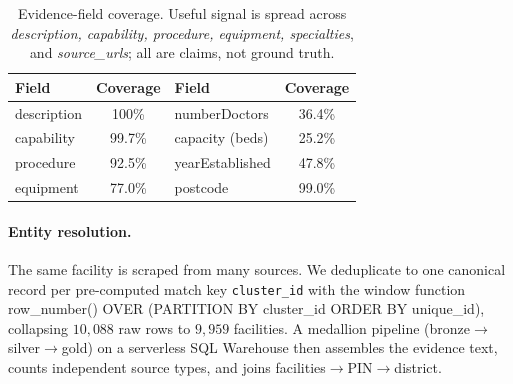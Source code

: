 \documentclass[11pt]{article}
\begin{document}
\begin{table}[H]\centering\small
\begin{tabular}{lc|lc}
\toprule
Field & Coverage & Field & Coverage\\
\midrule
description & 100\% & numberDoctors & 36.4\%\\
capability & 99.7\% & capacity (beds) & 25.2\%\\
procedure & 92.5\% & yearEstablished & 47.8\%\\
equipment & 77.0\% & postcode & 99.0\%\\
\bottomrule
\end{tabular}
\caption{Evidence-field coverage. Useful signal is spread across \emph{description, capability, procedure, equipment, specialties}, and \emph{source\_urls}; all are claims, not ground truth.}
\label{tab:coverage}
\end{table}

\paragraph{Entity resolution.} The same facility is scraped from many sources. We deduplicate to one canonical record per pre-computed match key \texttt{cluster\_id} with the window function {\small\ttfamily row\_number() OVER (PARTITION BY cluster\_id ORDER BY unique\_id)}, collapsing $10{,}088$ raw rows to $9{,}959$ facilities. A medallion pipeline (bronze$\to$silver$\to$gold) on a serverless SQL Warehouse then assembles the evidence text, counts independent source types, and joins facilities$\to$PIN$\to$district.
\end{document}
